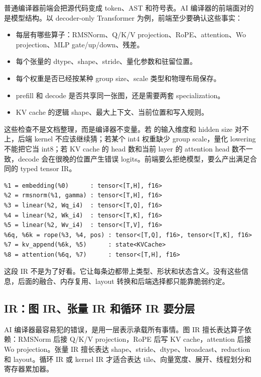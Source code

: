 普通编译器前端会把源代码变成 token、AST 和符号表。AI 编译器的前端面对的是模型结构。以 decoder-only Transformer 为例，前端至少要确认这些事实：

\begin{itemize}
  \item 每层有哪些算子：RMSNorm、Q/K/V projection、RoPE、attention、Wo projection、MLP gate/up/down、残差。
  \item 每个张量的 dtype、shape、stride、量化参数和驻留位置。
  \item 每个权重是否已经按某种 group size、scale 类型和物理布局保存。
  \item prefill 和 decode 是否共享同一张图，还是需要两套 specialization。
  \item KV cache 的逻辑 shape、最大上下文、当前位置和写入规则。
\end{itemize}

这些检查不是文档整理，而是编译器不变量。若  的输入维度和 hidden size 对不上，后端 kernel 不应该继续猜；若某个 int4 权重缺少 group scale，量化 lowering 不能把它当 int8；若 KV cache 的 head 数和当前 layer 的 attention head 数不一致，decode 会在很晚的位置产生错误 logits。前端要么拒绝模型，要么产出满足合同的 typed tensor IR。

\begin{lstlisting}[numbers=none,caption={typed tensor IR 的最小信息}]
%0 = input_tokens       : tensor<[T], i32>
%1 = embedding(%0)      : tensor<[T,H], f16>
%2 = rmsnorm(%1, gamma) : tensor<[T,H], f16>
%3 = linear(%2, Wq_i4)  : tensor<[T,Q], f16>
%4 = linear(%2, Wk_i4)  : tensor<[T,K], f16>
%5 = linear(%2, Wv_i4)  : tensor<[T,V], f16>
%6q, %6k = rope(%3, %4, pos) : tensor<[T,Q], f16>, tensor<[T,K], f16>
%7 = kv_append(%6k, %5)      : state<KVCache>
%8 = attention(%6q, %7)      : tensor<[T,H], f16>
\end{lstlisting}

这段 IR 不是为了好看。它让每条边都带上类型、形状和状态含义。没有这些信息，后面的融合、内存复用、layout 转换和后端选择都只能靠脆弱约定。

\subsection{IR：图 IR、张量 IR 和循环 IR 要分层}

AI 编译器最容易犯的错误，是用一层表示承载所有事情。图 IR 擅长表达算子依赖：RMSNorm 后接 Q/K/V projection，RoPE 后写 KV cache，attention 后接 Wo projection。张量 IR 擅长表达 shape、stride、dtype、broadcast、reduction 和 layout。循环 IR 或 kernel IR 才适合表达 tile、向量宽度、展开、线程划分和寄存器累加器。

